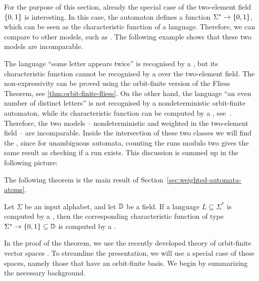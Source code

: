 For the purpose of this section, already the special case of the two-element
field $\{0,1\}$ is interesting. In this case, the automaton defines a
function $\Sigma^* \to \{0,1\}$, which can be seen as the characteristic
function of a language. Therefore, we can compare  to other models, such as . The
following example shows that these two  models are incomparable. 

\begin{myexample}\label{ex:weighted-vs-nondet-orbit-finite}
  The language ``some letter appears twice'' is recognised by a
  , but its characteristic function
  cannot be  recognised by a  over the
  two-element field. The non-expressivity can be proved using the orbit-finite
  version of the Fliess Theorem, see \cref{thm:orbit-finite-fliess}. On the
  other hand, the  language ``an even number of distinct letters'' is not
  recognised by a nondeterministic orbit-finite automaton, while its
  characteristic function can be computed by a , see~\cite[Example 3.2]{orbitFiniteVectorTheoretics}. Therefore,
  the two models -- nondeterministic and weighted in the two-element field --
  are incomparable. Inside the intersection of these two classes we will find
  the , since for unambiguous automata, counting the runs
  modulo two gives the same result as checking if a run exists. This discussion
  is summed up in the following picture:
\end{myexample}

The following theorem is the main result of Section~\ref{sec:weighted-automata-atoms}.
\begin{theorem}\label{thm:orbit-finite-protocol-to-weighted}
  Let $\Sigma$ be an  input alphabet, and let $\mathbb D$ be a field.
  If a language $L \subseteq \Sigma^*$ is computed by a , 
  then the corresponding characteristic function of type $\Sigma^* \to \{0,1\} \subseteq \mathbb D$
  is computed by a .
\end{theorem}

In the proof of the theorem, we use the recently developed theory of
orbit-finite vector spaces \cite{orbitFiniteVectorTheoretics}. To streamline
the presentation, we will use a special case of these spaces, namely those that
have an orbit-finite basis. We begin by summarizing the necessary background.

